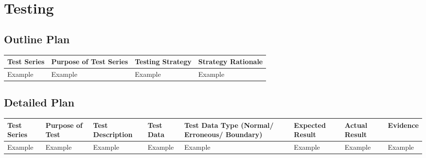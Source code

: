 \section{Testing}

\begin{landscape}
\subsection{Outline Plan}

\begin{center}
    \begin{tabular}{|p{2cm}|p{5cm}|p{5cm}|p{4cm}|}
        \hline
        \textbf{Test Series} & \textbf{Purpose of Test Series} & \textbf{Testing Strategy} & \textbf{Strategy Rationale}\\ \hline
        Example & Example & Example & Example \\ \hline
    \end{tabular}
\end{center}

\subsection{Detailed Plan}

\begin{center}
    \begin{longtable}{|p{1.5cm}|p{2.5cm}|p{2.5cm}|p{2cm}|p{2cm}|p{2cm}|p{2cm}|p{2cm}|}
        \hline
        \textbf{Test Series} & \textbf{Purpose of Test} & \textbf{Test Description} & \textbf{Test Data} & \textbf{Test Data Type (Normal/ Erroneous/ Boundary)} & \textbf{Expected Result} & \textbf{Actual Result} & \textbf{Evidence}\\ \hline
        Example & Example & Example & Example & Example & Example & Example & Example \\ \hline
    \end{longtable}
\end{center}
\end{landscape}
